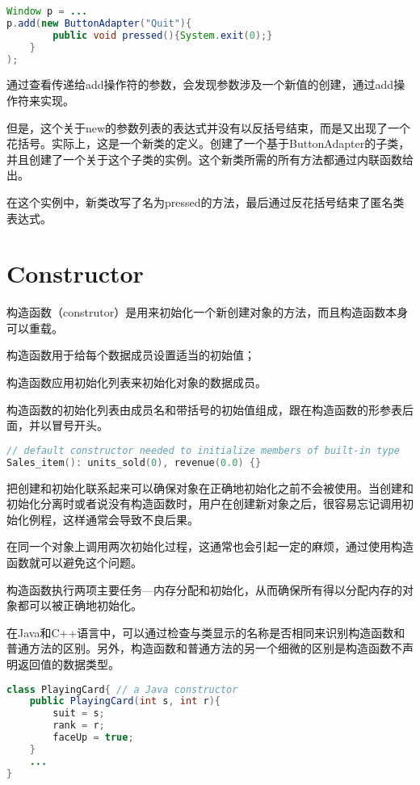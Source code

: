 \begin{lstlisting}[language=Java]
Window p = ...
p.add(new ButtonAdapter("Quit"){
		public void pressed(){System.exit(0);}
	}
);
\end{lstlisting}

通过查看传递给add操作符的参数，会发现参数涉及一个新值的创建，通过add操作符来实现。

但是，这个关于new的参数列表的表达式并没有以反括号结束，而是又出现了一个花括号。实际上，这是一个新类的定义。创建了一个基于ButtonAdapter的子类，并且创建了一个关于这个子类的实例。这个新类所需的所有方法都通过内联函数给出。

在这个实例中，新类改写了名为pressed的方法，最后通过反花括号结束了匿名类表达式。


\chapter{Constructor}

构造函数（construtor）是用来初始化一个新创建对象的方法，而且构造函数本身可以重载。

\begin{compactitem}
\item 构造函数用于给每个数据成员设置适当的初始值；
\item 构造函数应用初始化列表来初始化对象的数据成员。
\end{compactitem}

构造函数的初始化列表由成员名和带括号的初始值组成，跟在构造函数的形参表后面，并以冒号开头。

\begin{lstlisting}[language=C++]
// default constructor needed to initialize members of built-in type
Sales_item(): units_sold(0), revenue(0.0) {}
\end{lstlisting}

把创建和初始化联系起来可以确保对象在正确地初始化之前不会被使用。当创建和初始化分离时或者说没有构造函数时，用户在创建新对象之后，很容易忘记调用初始化例程，这样通常会导致不良后果。

在同一个对象上调用两次初始化过程，这通常也会引起一定的麻烦，通过使用构造函数就可以避免这个问题。

构造函数执行两项主要任务—内存分配和初始化，从而确保所有得以分配内存的对象都可以被正确地初始化。

在Java和C++语言中，可以通过检查与类显示的名称是否相同来识别构造函数和普通方法的区别。另外，构造函数和普通方法的另一个细微的区别是构造函数不声明返回值的数据类型。

\begin{lstlisting}[language=Java]
class PlayingCard{ // a Java constructor
	public PlayingCard(int s, int r){
		suit = s;
		rank = r;
		faceUp = true;
	}
	...
}
\end{lstlisting}



